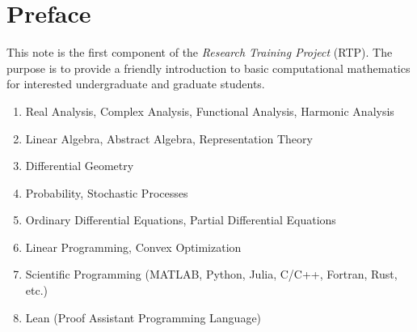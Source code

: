 \chapter*{Preface}

This note is the first component of the \emph{Research Training Project} (RTP).  The purpose is to provide a friendly introduction to basic computational mathematics for interested undergraduate and graduate students.
\vspace{2cm}

{}

\begin{enumerate}
    \item Real Analysis, Complex Analysis, Functional Analysis, Harmonic Analysis
    \item Linear Algebra, Abstract Algebra, Representation Theory
    \item Differential Geometry
    \item Probability, Stochastic Processes
    \item Ordinary Differential Equations, Partial Differential Equations 
    \item Linear Programming, Convex Optimization
    \item Scientific Programming (MATLAB, Python, Julia, C/C++, Fortran, Rust, etc.)
    \item Lean (Proof Assistant Programming Language)
\end{enumerate}